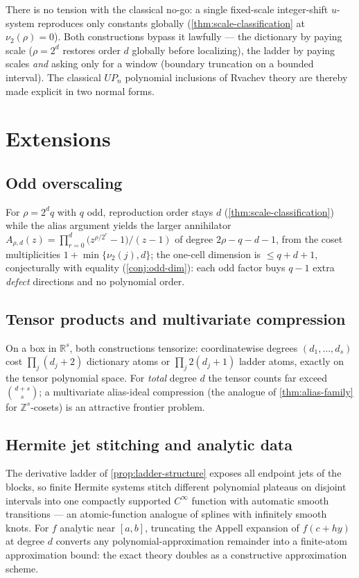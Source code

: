 \documentclass[11pt,oneside]{article}
\numberwithin{equation}{section}
\theoremstyle{definition}
\theoremstyle{remark}
\newcommand{\R}{\mathbb R}
\newcommand{\Z}{\mathbb Z}
\newcommand{\vtwo}{\nu_2}
\begin{document}
\begin{remark}
There is no tension with the classical no-go: a single fixed-scale
integer-shift $u$-system reproduces only constants globally
(\cref{thm:scale-classification} at $\vtwo(\rho)=0$).  Both
constructions bypass it lawfully --- the dictionary by paying scale
($\rho=2^{d}$ restores order $d$ globally before localizing), the
ladder by paying scales \emph{and} asking only for a window (boundary
truncation on a bounded interval).  The classical $UP_n$ polynomial
inclusions of Rvachev theory \cite{RvachevRvachev1972,Rvachev1990}
are thereby made explicit in two normal forms.
\end{remark}

\section{Extensions}
\label{sec:extensions}

\subsection{Odd overscaling}
For $\rho=2^{d}q$ with $q$ odd, reproduction order stays $d$
(\cref{thm:scale-classification}) while the alias argument yields the
larger annihilator
$A_{\rho,d}(z)=\prod_{r=0}^{d}\bigl(z^{\rho/2^{r}}-1\bigr)/(z-1)$ of
degree $2\rho-q-d-1$, from the coset multiplicities
$1+\min\{\vtwo(j),d\}$; the one-cell dimension is
$\le q+d+1$, conjecturally with equality
(\cref{conj:odd-dim}): each odd factor buys $q-1$ extra
\emph{defect} directions and no polynomial order.

\subsection{Tensor products and multivariate compression}
On a box in $\R^{s}$, both constructions tensorize: coordinatewise
degrees $(d_1,\dots,d_s)$ cost $\prod_j(d_j+2)$ dictionary atoms or
$\prod_j2(d_j+1)$ ladder atoms, exactly on the tensor polynomial
space.  For \emph{total} degree $d$ the tensor counts far exceed
$\binom{d+s}s$; a multivariate alias-ideal compression (the analogue
of \cref{thm:alias-family} for $\Z^{s}$-cosets) is an attractive
frontier problem.

\subsection{Hermite jet stitching and analytic data}
The derivative ladder of \cref{prop:ladder-structure} exposes all
endpoint jets of the blocks, so finite Hermite systems stitch
different polynomial plateaus on disjoint intervals into one
compactly supported $C^\infty$ function with automatic smooth
transitions --- an atomic-function analogue of splines with
infinitely smooth knots.  For $f$ analytic near $[a,b]$, truncating
the Appell expansion of $f(c+hy)$ at degree $d$ converts any
polynomial-approximation remainder into a finite-atom approximation
bound: the exact theory doubles as a constructive approximation
scheme.
\end{document}
